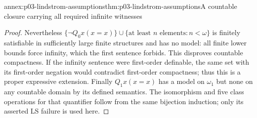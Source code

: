 \begin{annexitem}{annex:p03-lindstrom-assumptions}{thm:p03-lindstrom-assumptions}{A countable closure carrying all required infinite witnesses}
\begin{proof}
Nevertheless
\(\{\neg Q_0x(x=x)\}\cup\{\text{at least }n\text{ elements}:n<\omega\}\)
is finitely satisfiable in sufficiently large finite structures and has
no model: all finite lower bounds force infinity, which the first sentence
forbids. This disproves countable compactness. If the infinity sentence
were first-order definable, the same set with its first-order negation
would contradict first-order compactness; thus this is a proper expressive
extension. Finally \(Q_1x(x=x)\) has a model on \(\omega_1\) but none
on any countable domain by its defined semantics. The isomorphism and
five class operations for that quantifier follow from the same bijection
induction; only its asserted LS failure is used here.
\end{proof}
\end{annexitem}

